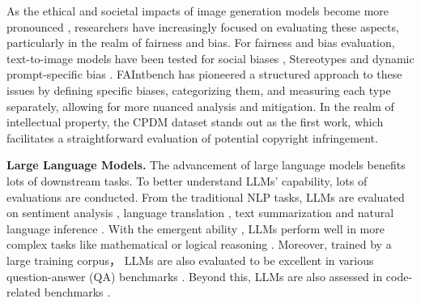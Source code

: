As the ethical and societal impacts of image generation models become more pronounced \cite{schramowski2023safe, qu2023unsafe}, researchers have increasingly focused on evaluating these aspects, particularly in the realm of fairness and bias. For fairness and bias evaluation, text-to-image models have been tested for social biases \cite{luccioni2024stable,cho2023dalleval,luo2024bigbenchunifiedbenchmarksocial}, Stereotypes \cite{bianchi2023easily,friedrich2024multilingual,jha2024visage} and dynamic prompt-specific bias \cite{chinchure2023tibet}. FAIntbench \cite{luo2024faintbench} has pioneered a structured approach to these issues by defining specific biases, categorizing them, and measuring each type separately, allowing for more nuanced analysis and mitigation. In the realm of intellectual property, the CPDM dataset \cite{ma2024dataset} stands out as the first work, which facilitates a straightforward evaluation of potential copyright infringement. 




\textbf{Large Language Models.} The advancement of large language models benefits lots of downstream tasks. To better understand LLMs' capability, lots of evaluations are conducted. From the traditional NLP tasks, LLMs are evaluated on sentiment analysis \cite{lopezlira2023chatgpt, zhang2023sentiment, qin2023chatgpt}, language translation \cite{Zhang2023PromptingLL, Kocmi2023LargeLM, Lu2023ErrorAP}, text summarization \cite{qin2023chatgpt, zhang2023benchmarking, gao2023human} and natural language inference \cite{qin2023chatgpt, mckenna2023sources}. With the emergent ability \cite{wei2022emergent}, LLMs perform well in more complex tasks like mathematical or logical reasoning \cite{qin2023chatgpt, frieder2023mathematical, liu2023evaluating2, pan2023logiclm, Liang2024MathChatBM, Cobbe2021TrainingVT, yuan2023large, wei2023cmath, liang2024scemqa}. Moreover, trained by a large training corpus， LLMs are also evaluated to be excellent in various question-answer (QA) benchmarks \cite{zhang2023m3exam, hendrycks2020measuring, Liang2024SceMQAAS, Sun2023SciEvalAM, rajpurkar2016squad, rajpurkar2018know, yang2018hotpotqa, joshi2017triviaqa, jin2019pubmedqa}. Beyond this, LLMs are also assessed in code-related benchmarks \cite{zhong2023chatgpt, liu2023refining, fu2023codeapex, liu2023code, Zhang2024NaturalCodeBenchEC, Peng2024HumanEvalXLAM}.

